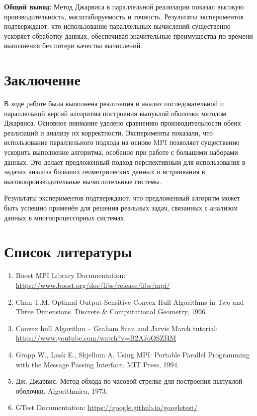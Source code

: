 \documentclass[a4paper,12pt]{article}
\begin{document}
\textbf{Общий вывод:}
Метод Джарвиса в параллельной реализации показал высокую производительность, масштабируемость и точность. Результаты экспериментов подтверждают, что использование параллельных вычислений существенно ускоряет обработку данных, обеспечивая значительные преимущества по времени выполнения без потери качества вычислений.

\newpage

\section{Заключение}
В ходе работе была выполнена реализация и анализ последовательной и параллельной версий алгоритма построения выпуклой оболочки методом Джарвиса. Основное внимание уделено сравнению производительности обеих реализаций и анализу их корректности. Эксперименты показали, что использование параллельного подхода на основе MPI позволяет существенно ускорить выполнение алгоритма, особенно при работе с большими наборами данных. Это делает предложенный подход перспективным для использования в задачах анализа больших геометрических данных и встраивания в высокопроизводительные вычислительные системы.

Результаты экспериментов подтверждают, что предложенный алгоритм может быть успешно применён для решения реальных задач, связанных с анализом данных в многопроцессорных системах.

\newpage

\section{Список литературы}
\begin{enumerate}
    \item Boost MPI Library Documentation: \url{https://www.boost.org/doc/libs/release/libs/mpi/}
    \item Chan T.M. Optimal Output-Sensitive Convex Hull Algorithms in Two and Three Dimensions. Discrete \& Computational Geometry, 1996.
    \item Convex hull Algorithm – Graham Scan and Jarvis March tutorial: \url{https://www.youtube.com/watch?v=B2AJoQSZf4M}
    \item Gropp W., Lusk E., Skjellum A. Using MPI: Portable Parallel Programming with the Message Passing Interface. MIT Press, 1994.
    \item Дж. Джарвис. Метод обхода по часовой стрелке для построения выпуклой оболочки. Algorithmica, 1973.
    \item GTest Documentation: \url{https://google.github.io/googletest/}
\end{enumerate}
\end{document}
